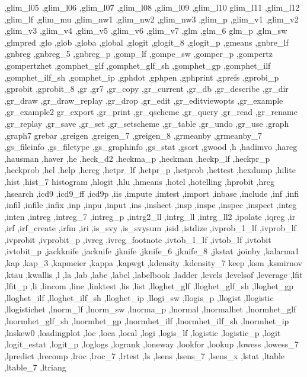 {{    ,glim_l05 ,glim_l06 ,glim_l07 ,glim_l08 ,glim_l09 ,glim_l10 glim_l11
    ,glim_l12 ,glim_lf ,glim_mu ,glim_nw1 ,glim_nw2 ,glim_nw3 ,glim_p
    ,glim_v1 ,glim_v2 ,glim_v3 ,glim_v4 ,glim_v5 ,glim_v6 ,glim_v7 ,glm
    ,glm_6 glm_p ,glm_sw ,glmpred ,glo ,glob ,globa ,global ,glogit
    ,glogit_8 ,glogit_p ,gmeans ,gnbre_lf ,gnbreg ,gnbreg_5 ,gnbreg_p
    ,gomp_lf ,gompe_sw ,gomper_p ,gompertz ,gompertzhet ,gomphet_glf
    ,gomphet_glf_sh ,gomphet_gp ,gomphet_ilf ,gomphet_ilf_sh ,gomphet_ip
    ,gphdot ,gphpen ,gphprint ,gprefs ,gprobi_p ,gprobit ,gprobit_8
    ,gr ,gr7 ,gr_copy ,gr_current ,gr_db ,gr_describe ,gr_dir ,gr_draw
    ,gr_draw_replay ,gr_drop ,gr_edit ,gr_editviewopts ,gr_example
    ,gr_example2 gr_export ,gr_print ,gr_qscheme ,gr_query ,gr_read
    ,gr_rename ,gr_replay ,gr_save ,gr_set ,gr_setscheme ,gr_table
    ,gr_undo ,gr_use ,graph ,graph7 grebar ,greigen ,greigen_7
    ,greigen_8 ,grmeanby ,grmeanby_7 ,gs_fileinfo ,gs_filetype
    ,gs_graphinfo ,gs_stat ,gsort ,gwood ,h ,hadimvo ,hareg ,hausman
    ,haver ,he ,heck_d2 ,heckma_p ,heckman ,heckp_lf ,heckpr_p ,heckprob
    ,hel ,help ,hereg ,hetpr_lf ,hetpr_p ,hetprob ,hettest ,hexdump
    ,hilite ,hist ,hist_7 histogram ,hlogit ,hlu ,hmeans ,hotel
    ,hotelling ,hprobit ,hreg ,hsearch ,icd9 ,icd9_ff ,icd9p ,iis
    ,impute ,imtest ,import ,inbase ,include ,inf ,infi ,infil ,infile ,infix
    ,inp ,inpu ,input ,ins ,insheet ,insp ,inspe ,inspec ,inspect ,integ
    ,inten ,intreg ,intreg_7 ,intreg_p ,intrg2_ll ,intrg_ll ,intrg_ll2
    ,ipolate ,iqreg ,ir ,irf ,irf_create ,irfm ,iri ,is_svy ,is_svysum
    ,isid ,istdize ,ivprob_1_lf ,ivprob_lf ,ivprobit ,ivprobit_p ,ivreg
    ,ivreg_footnote ,ivtob_1_lf ,ivtob_lf ,ivtobit ,ivtobit_p ,jackknife
    ,jacknife ,jknife ,jknife_6 ,jknife_8 ,jkstat ,joinby ,kalarma1
    ,kap ,kap_3 ,kapmeier ,kappa ,kapwgt ,kdensity ,kdensity_7 keep
    ,ksm ,ksmirnov ,ktau ,kwallis ,l ,la ,lab ,labe ,label ,labelbook
    ,ladder ,levels ,levelsof ,leverage ,lfit ,lfit_p ,li ,lincom ,line
    ,linktest ,lis ,list ,lloghet_glf ,lloghet_glf_sh ,lloghet_gp
    ,lloghet_ilf ,lloghet_ilf_sh ,lloghet_ip ,llogi_sw ,llogis_p
    ,llogist ,llogistic ,llogistichet ,lnorm_lf ,lnorm_sw ,lnorma_p
    ,lnormal ,lnormalhet ,lnormhet_glf ,lnormhet_glf_sh ,lnormhet_gp
    ,lnormhet_ilf ,lnormhet_ilf_sh ,lnormhet_ip ,lnskew0 ,loadingplot
    ,loc ,loca ,local ,logi ,logis_lf ,logistic ,logistic_p
    ,logit ,logit_estat ,logit_p ,loglogs ,logrank ,loneway ,lookfor
    ,lookup ,lowess ,lowess_7 ,lpredict ,lrecomp ,lroc ,lroc_7 ,lrtest
    ,ls ,lsens ,lsens_7 ,lsens_x ,lstat ,ltable ,ltable_7 ,ltriang
}}
